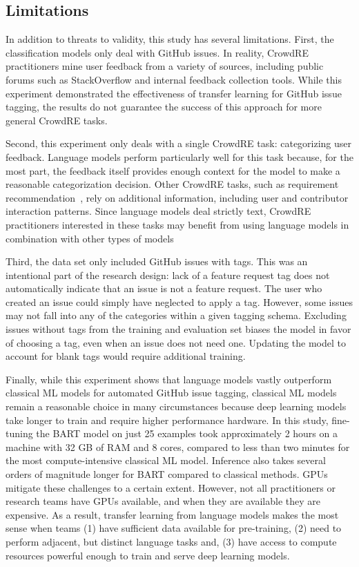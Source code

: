 \subsection{Limitations}

In addition to threats to validity, this study has several limitations. First, the classification models only deal with GitHub issues. In reality, CrowdRE practitioners mine user feedback from a variety of sources, including public forums such as StackOverflow and internal feedback collection tools. While this experiment demonstrated the effectiveness of transfer learning for GitHub issue tagging, the results do not guarantee the success of this approach for more general CrowdRE tasks.

Second, this experiment only deals with a single CrowdRE task: categorizing user feedback. Language models perform particularly well for this task because, for the most part, the feedback itself provides enough context for the model to make a reasonable categorization decision. Other CrowdRE tasks, such as requirement recommendation~\cite{stakerare, mobasher}, rely on additional information, including user and contributor interaction patterns. Since language models deal strictly text, CrowdRE practitioners interested in these tasks may benefit from using language models in combination with other types of models

Third, the data set only included GitHub issues with tags. This was an intentional part of the research design: lack of a feature request tag does not automatically indicate that an issue is not a feature request. The user who created an issue could simply have neglected to apply a tag. However, some issues may not fall into any of the categories within a given tagging schema. Excluding issues without tags from the training and evaluation set biases the model in favor of choosing a tag, even when an issue does not need one. Updating the model to account for blank tags would require additional training.

Finally, while this experiment shows that language models vastly outperform classical ML models for automated GitHub issue tagging, classical ML models remain a reasonable choice in many circumstances because deep learning models take longer to train and require higher performance hardware. In this study, fine-tuning the BART model on just 25 examples took approximately 2 hours on a machine with 32 GB of RAM and 8 cores, compared to less than two minutes for the most compute-intensive classical ML model. Inference also takes several orders of magnitude longer for BART compared to classical methods. GPUs mitigate these challenges to a certain extent. However, not all practitioners or research teams have GPUs available, and when they are available they are expensive. As a result, transfer learning from language models makes the most sense when teams (1) have sufficient data available for pre-training, (2) need to perform adjacent, but distinct language tasks and, (3) have access to compute resources powerful enough to train and serve deep learning models.

